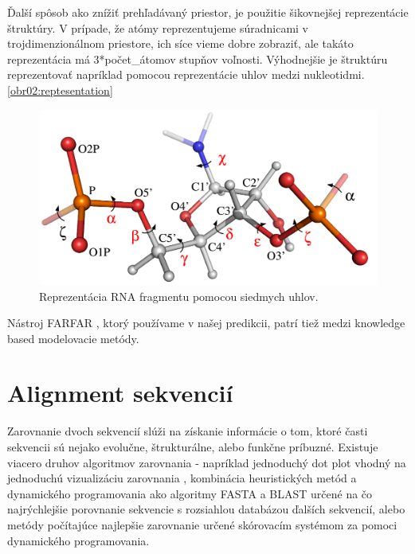 \indent Ďalší spôsob ako znížiť prehľadávaný priestor, je použitie šikovnejšej reprezentácie štruktúry. V prípade, že atómy reprezentujeme súradnicami v trojdimenzionálnom priestore, ich síce vieme dobre zobraziť, ale takáto reprezentácia má 3*počet\_átomov stupňov voľnosti. Výhodnejšie je štruktúru reprezentovať napríklad pomocou reprezentácie uhlov medzi nukleotidmi.  \autoref{obr02:reptesentation}


\begin{figure}%
\includegraphics[width=\textwidth]{../img/str_reprezentace_uhly}
\caption{Reprezentácia RNA fragmentu pomocou siedmych uhlov. \cite{Frellsen09} }
\label{obr02:reptesentation}
\end{figure}


\indent Nástroj FARFAR \cite{Das10}, ktorý používame v našej predikcii, patrí tiež medzi knowledge based modelovacie metódy.


\section{Alignment sekvencií}
Zarovnanie dvoch sekvencií slúži na získanie informácie o tom, ktoré časti sekvencii sú nejako evolučne, štrukturálne, alebo funkčne príbuzné. Existuje viacero druhov algoritmov zarovnania - napríklad jednoduchý dot plot vhodný na jednoduchú vizualizáciu zarovnania  \cite{Gibbs70}, kombinácia heuristických metód a dynamického programovania ako algoritmy FASTA a BLAST určené na čo najrýchlejšie porovnanie sekvencie s rozsiahlou databázou ďalších sekvencií, alebo metódy počítajúce najlepšie zarovnanie určené skórovacím systémom za pomoci dynamického programovania.


